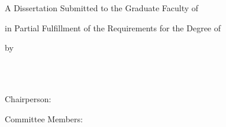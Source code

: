 \thispagestyle{empty}
\vspace*{1in}

\begin{center}
\doublespacing

{\bfseries \dissertationtitle}

\vspace{0.5in}

A Dissertation Submitted to the Graduate Faculty of

\universityname

in Partial Fulfillment of the Requirements for the Degree of

\degreeawarded

\vspace{0.5in}

by

\authorname

\vspace{0.5in}

\departmentname\\
\universityname\\
\dissertationyear

\vspace{0.5in}

Chairperson: \chairname

Committee Members:

\committeemembertwo

\committeememberthree

\end{center}

\newpage